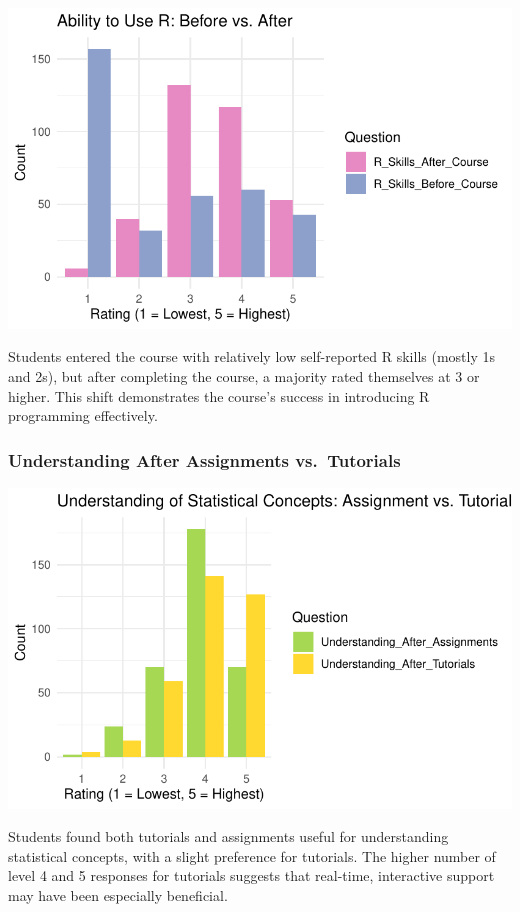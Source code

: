 \documentclass[
  letterpaper,
  DIV=11,
  numbers=noendperiod]{scrartcl}
\begin{document}
\includegraphics{paper_files/figure-pdf/unnamed-chunk-4-1.pdf}

Students entered the course with relatively low self-reported R skills
(mostly 1s and 2s), but after completing the course, a majority rated
themselves at 3 or higher. This shift demonstrates the course's success
in introducing R programming effectively.

\subsubsection{Understanding After Assignments
vs.~Tutorials}\label{understanding-after-assignments-vs.-tutorials}

\includegraphics{paper_files/figure-pdf/unnamed-chunk-5-1.pdf}

Students found both tutorials and assignments useful for understanding
statistical concepts, with a slight preference for tutorials. The higher
number of level 4 and 5 responses for tutorials suggests that real-time,
interactive support may have been especially beneficial.
\end{document}
